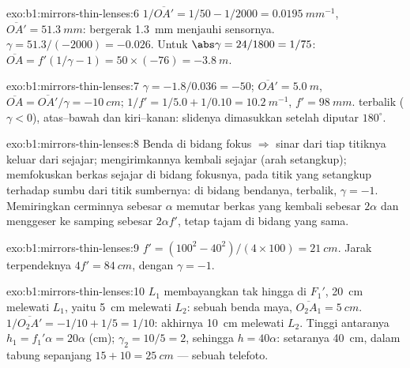 \begin{solution}{exo:b1:mirrors-thin-lenses:6}
$1/\overline{OA'} = 1/50 - 1/2000 = \qty{0.0195}{mm^{-1}}$,
$\overline{OA'} = \qty{51.3}{mm}$:  bergerak \qty{1.3}{mm} menjauhi
sensornya. $\gamma = 51.3/(-2000) = -0.026$. Untuk $\abs\gamma = 24/1800
= 1/75$: $\overline{OA} = f'(1/\gamma - 1) = 50 \times (-76) =
\qty{-3.8}{m}$.
\end{solution}

\begin{solution}{exo:b1:mirrors-thin-lenses:7}
$\gamma = -1.8/0.036 = -50$; $\overline{OA'} = \qty{5.0}{m}$,
$\overline{OA} = \overline{OA'}/\gamma = \qty{-10}{cm}$;
$1/f' = 1/5.0 + 1/0.10 = \qty{10.2}{m^{-1}}$, $f' = \qty{98}{mm}$.
 terbalik ($\gamma < 0$), atas--bawah dan kiri--kanan: slidenya
dimasukkan setelah diputar $180^\circ$.
\end{solution}

\begin{solution}{exo:b1:mirrors-thin-lenses:8}
Benda di bidang fokus $\Rightarrow$ sinar dari tiap titiknya keluar dari
 sejajar;  mengirimkannya kembali sejajar (arah
setangkup);  memfokuskan berkas sejajar di bidang fokusnya, pada
titik yang setangkup terhadap sumbu dari titik sumbernya:  di
bidang bendanya, terbalik, $\gamma = -1$. Memiringkan cerminnya sebesar
$\alpha$ memutar berkas yang kembali sebesar $2\alpha$ dan menggeser
 ke samping sebesar $2\alpha f'$, tetap tajam di bidang yang sama.
\end{solution}

\begin{solution}{exo:b1:mirrors-thin-lenses:9}
$f' = (100^2 - 40^2)/(4 \times 100) = \qty{21}{cm}$. Jarak terpendeknya
$4f' = \qty{84}{cm}$, dengan $\gamma = -1$.
\end{solution}

\begin{solution}{exo:b1:mirrors-thin-lenses:10}
$L_1$ membayangkan tak hingga di $F_1'$, \qty{20}{cm} melewati $L_1$, yaitu \qty{5}{cm}
melewati $L_2$: sebuah benda maya, $\overline{O_2A_1} = \qty{+5}{cm}$.
$1/\overline{O_2A'} = -1/10 + 1/5 = 1/10$:  akhirnya \qty{10}{cm}
melewati $L_2$. Tinggi  antaranya $h_1 = f_1'\alpha = 20\alpha$ (cm);
$\gamma_2 = 10/5 = 2$, sehingga $h = 40\alpha$:  setaranya
\qty{40}{cm}, dalam tabung sepanjang $15 + 10 = \qty{25}{cm}$ --- sebuah telefoto.
\end{solution}

